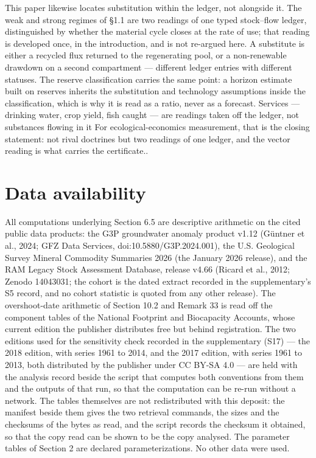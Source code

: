 \documentclass[11pt]{article}
\begin{document}
This paper likewise locates substitution within the ledger, not alongside it. The weak and strong regimes of \S1.1 are two readings of one typed stock--flow ledger, distinguished by whether the material cycle closes at the rate of use; that reading is developed once, in the introduction, and is not re-argued here. A substitute is either a recycled flux returned to the regenerating pool, or a non-renewable drawdown on a second compartment --- different ledger entries with different statuses. The reserve classification carries the same point: a horizon estimate built on reserves inherits the substitution and technology assumptions inside the classification, which is why it is read as a ratio, never as a forecast. Services --- drinking water, crop yield, fish caught --- are readings taken off the ledger, not substances flowing in it For ecological-economics measurement, that is the closing statement: not rival doctrines but two readings of one ledger, and the vector reading is what carries the certificate..

\vspace{0.8em}

\section*{Data availability}\label{data-availability}

All computations underlying Section 6.5 are descriptive arithmetic on the cited public data products: the G3P groundwater anomaly product v1.12 (G\"{u}ntner et al., 2024; GFZ Data Services, doi:10.5880/\allowbreak{}G3P.2024.001), the U.S. Geological Survey Mineral Commodity Summaries 2026 (the January 2026 release), and the RAM Legacy Stock Assessment Database, release v4.66 (Ricard et al., 2012; Zenodo 14043031; the cohort is the dated extract recorded in the supplementary's S5 record, and no cohort statistic is quoted from any other release). The overshoot-date arithmetic of Section 10.2 and Remark 33 is read off the component tables of the National Footprint and Biocapacity Accounts, whose current edition the publisher distributes free but behind registration. The two editions used for the sensitivity check recorded in the supplementary (S17) --- the 2018 edition, with series 1961 to 2014, and the 2017 edition, with series 1961 to 2013, both distributed by the publisher under CC BY-SA 4.0 --- are held with the analysis record beside the script that computes both conventions from them and the outputs of that run, so that the computation can be re-run without a network. The tables themselves are not redistributed with this deposit: the manifest beside them gives the two retrieval commands, the sizes and the checksums of the bytes as read, and the script records the checksum it obtained, so that the copy read can be shown to be the copy analysed. The parameter tables of Section 2 are declared parameterizations. No other data were used.
\end{document}
